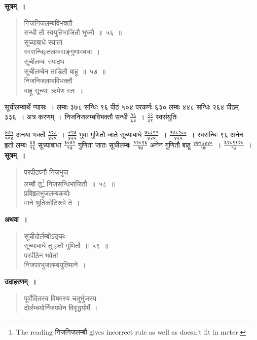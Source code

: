 \documentclass[11pt, openany]{book}
\begin{document}
 \textbf{सूत्रम्~।} 
\begin{quote}
    \bs 
निजनिजलम्बविभक्तौ \\
सन्धी तौ स्वयुतिभाजितौ भूघ्नौ~॥~५६~॥ \\
सूच्याबाधे स्यातां \\
स्वसन्धिहृतलम्बसङ्गुणावबधा~।\\
सूचीलम्बः स्यादथ \\
सूचीलम्बेन ताडितौ बाहू~॥~५७~॥ \\
निजनिजलम्बविभक्तौ \\
बाहू सूच्याः क्रमेण स्तः~।
\end{quote}

 सूचीलम्बार्थे न्यासः~। लम्बः ३७८ सन्धिः ९६ पीठं ५०४
परकर्णः ६३० लम्बः ४४८ सन्धिः २६४ पीठम् ३३६~। अत्र करणम्~। निजनिजलम्बविभक्तौ सन्धी $\frac{\mbox{१६}}{\mbox{६३}}$~। $\frac{\mbox{२२}}{\mbox{३९}}$ स्वसंयुतिः
\newpage
\setcounter{footnote}{0}

\noindent $\frac{\mbox{४७५}}{\mbox{५०४}}$ अनया भक्तौ $\frac{\mbox{१२८}}{\mbox{४२५}}$~। $\frac{\mbox{२९७}}{\mbox{४२५}}$ भुवा गुणितौ जाते सूच्याबाधे
$\frac{\mbox{७६८००}}{\mbox{४२५}}$~। $\frac{\mbox{१७८२००}}{\mbox{४२५}}$~। स्वसन्धिः ९६ अनेन हृतो लम्बः $\frac{\mbox{६३}}{\mbox{१६}}$
सूच्याबाधा 
$\frac{\mbox{३०७२}}{\mbox{१७}}$ गुणिता जातः सूचीलम्बः
$\frac{\mbox{१२०९६}}{\mbox{१७}}$ अनेन
गुणितौ बाहू
$\frac{\mbox{४७१७४४०}}{\mbox{१७}}$~। $\frac{\mbox{६२८९९२०}}{\mbox{१७}}$~। \\

 \textbf{सूत्रम्~।} 
\begin{quote}
    \bs 
परपीठघ्नौ निजभुज-\\
लम्बौ तु\footnote{The reading निजनिजलम्बौ gives incorrect rule as well as doesn't fit in meter.} निजसन्धिभाजितौ~॥~५८~॥ \\
प्रविहृतभुजलम्बकयोः \\
माने श्रुतिकोटिरूपे ते~।
\end{quote}

\textbf{अथवा~।} 
\begin{quote}
    \bs 
सूचीदोर्लम्बोऽङ्कः \\
सूच्याबाधे तु हृतौ गुणितौ~॥~५९~॥\\
परपीठेन भवेतां \\
निजपरभुजलम्बयुतिमाने~।
\end{quote}

 \textbf{उदाहरणम्~।} 
\begin{quote}
    \bqt 
पूर्वोदितस्य विषमस्य चतुर्भुजस्य \\
दोर्लम्बयोर्निजपथेन विवृद्धयोर्मे~।
\end{quote}
\newpage
\end{document}
